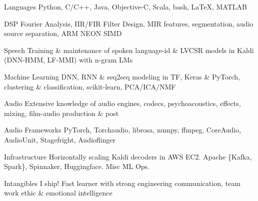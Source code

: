

\begin{cvskills}

  \cvskill
    {Languages} %
    {Python, C/C++, Java, Objective-C, Scala, bash, LaTeX, MATLAB}

  \cvskill
    {DSP} %
    {Fourier Analysis, IIR/FIR Filter Design, MIR features, segmentation, audio source separation, ARM NEON SIMD} %
    
  \cvskill
    {Speech} %
    {Training \& maintenance of spoken language-id \& LVCSR models in Kaldi (DNN-HMM, LF-MMI) with n-gram LMs} %

  \cvskill
    {Machine Learning} %
    {DNN, RNN \& seq2seq modeling in TF, Keras \& PyTorch, clustering \& classification, scikit-learn, PCA/ICA/NMF} %
       
  \cvskill
    {Audio} %
    {Extensive knowledge of audio engines, codecs, psychoacoustics, effects, mixing, film-audio production \& post} %

  \cvskill
    {Audio Frameworks} %
    {PyTorch, Torchaudio, librosa, numpy, ffmpeg, CoreAudio, AudioUnit, Stagefright, Audioflinger} %

  \cvskill
    {Infrastructure} %
    {Horizontally scaling Kaldi decoders in AWS EC2. Apache \{Kafka, Spark\}, Spinnaker, Huggingface. Misc ML Ops.} %

  \cvskill
    {Intangibles} %
    {I ship! Fast learner with strong engineering communication, team work ethic \& emotional intelligence} %



\end{cvskills}

